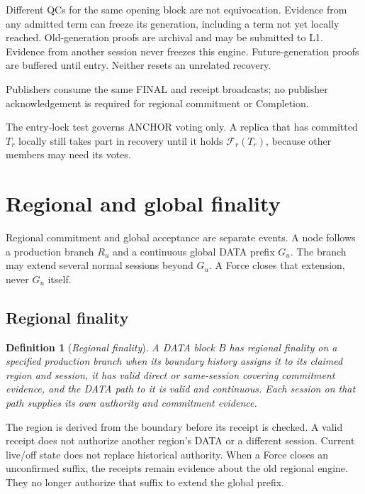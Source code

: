\documentclass[11pt,a4paper]{article}
\newcommand{\RR}[1]{{\color{rrRed}#1}}
\newcommand{\FC}{\mathcal F}
\newcommand{\defterm}[1]{\textcolor{rrBlue}{\textit{#1}}}
\newtheorem{definition}{Definition}[section]
\begin{document}
Different QCs for the same opening block are not equivocation. Evidence
from any admitted term can freeze its generation, including a term not
yet locally reached. Old-generation proofs are archival and may be
submitted to L1. \RR{Evidence from another session never freezes this
engine.} Future-generation proofs are buffered until entry. Neither
resets an unrelated recovery.

Publishers consume the same FINAL and receipt broadcasts; no publisher
acknowledgement is required for regional commitment or Completion.

The entry-lock test governs ANCHOR voting only. A replica that has
committed $T_r$ locally still takes part in recovery until it holds
$\FC_r(T_r)$, because other members may need its votes.

\section{Regional and global finality}
\label{sec:external}
Regional commitment and global acceptance are separate events.
A node follows a production branch $R_u$ and a continuous global DATA
prefix $G_u$. The branch may extend several normal sessions beyond
$G_u$. A Force closes that extension, never $G_u$ itself.

\subsection{Regional finality}
\label{sec:regional-finality}
\begin{definition}[\defterm{Regional finality}]
\label{def:regional-finality}
A DATA block $B$ has regional finality on a specified production branch
when its boundary history assigns it to its claimed region and session,
it has valid direct or same-session covering commitment evidence, and
the DATA path to it is valid and continuous. Each session on that path
supplies its own authority and commitment evidence.
\end{definition}
The region is derived from the boundary before its receipt is checked.
A valid receipt does not authorize another region's DATA or a different
session. Current live/off state does not replace historical authority.
When a Force closes an unconfirmed suffix, the receipts remain evidence
about the old regional engine. They no longer authorize that suffix to
extend the global prefix.
\end{document}
